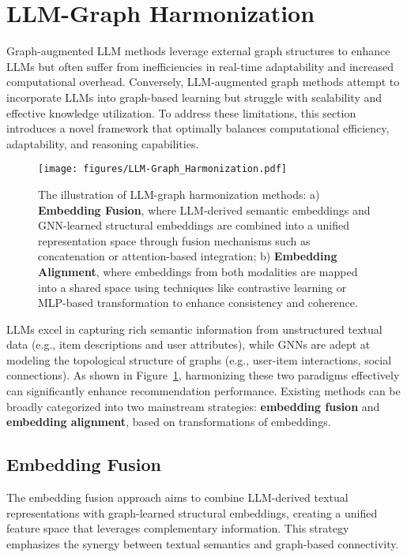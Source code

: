 \section{LLM-Graph Harmonization}

Graph-augmented LLM methods leverage external graph structures to enhance LLMs but often suffer from inefficiencies in real-time adaptability and increased computational overhead. Conversely, LLM-augmented graph methods attempt to incorporate LLMs into graph-based learning but struggle with scalability and effective knowledge utilization. To address these limitations, this section introduces a novel framework that optimally balances computational efficiency, adaptability, and reasoning capabilities.
\begin{figure}[t]
    \centering
    \texttt{[image: figures/LLM-Graph\_Harmonization.pdf]}
    \caption{The illustration of LLM-graph harmonization methods:  
    a) \textbf{Embedding Fusion}, where LLM-derived semantic embeddings and GNN-learned structural embeddings are combined into a unified representation space through fusion mechanisms such as concatenation or attention-based integration;  
    b) \textbf{Embedding Alignment}, where embeddings from both modalities are mapped into a shared space using techniques like contrastive learning or MLP-based transformation to enhance consistency and coherence.  }
    \label{fig:LLM-graph harmonization}
\end{figure}

LLMs excel in capturing rich semantic information from unstructured textual data (e.g., item descriptions and user attributes), while GNNs are adept at modeling the topological structure of graphs (e.g., user-item interactions, social connections). As shown in Figure~\ref{fig:LLM-graph harmonization}, harmonizing these two paradigms effectively can significantly enhance recommendation performance. Existing methods can be broadly categorized into two mainstream strategies: \textbf{embedding fusion} and \textbf{embedding alignment}, based on transformations of embeddings.

\subsection{Embedding Fusion}

The embedding fusion approach aims to combine LLM-derived textual representations with graph-learned structural embeddings, creating a unified feature space that leverages complementary information. This strategy emphasizes the synergy between textual semantics and graph-based connectivity.


